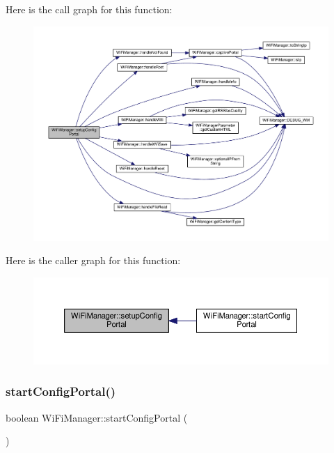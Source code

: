 Here is the call graph for this function\+:\nopagebreak
\begin{figure}[H]
\begin{center}
\leavevmode
\includegraphics[width=350pt]{class_wi_fi_manager_a1743325d0dd86d011df96b22d2a0ddd6_cgraph}
\end{center}
\end{figure}
Here is the caller graph for this function\+:\nopagebreak
\begin{figure}[H]
\begin{center}
\leavevmode
\includegraphics[width=350pt]{class_wi_fi_manager_a1743325d0dd86d011df96b22d2a0ddd6_icgraph}
\end{center}
\end{figure}
\mbox{\label{class_wi_fi_manager_ad781751307f7f623956126096a09a545}} 
\subsubsection{\texorpdfstring{start\+Config\+Portal()}{startConfigPortal()}\hspace{0.1cm}{\footnotesize\ttfamily [1/2]}}
{\footnotesize\ttfamily boolean Wi\+Fi\+Manager\+::start\+Config\+Portal (\begin{DoxyParamCaption}{ }\end{DoxyParamCaption})}



